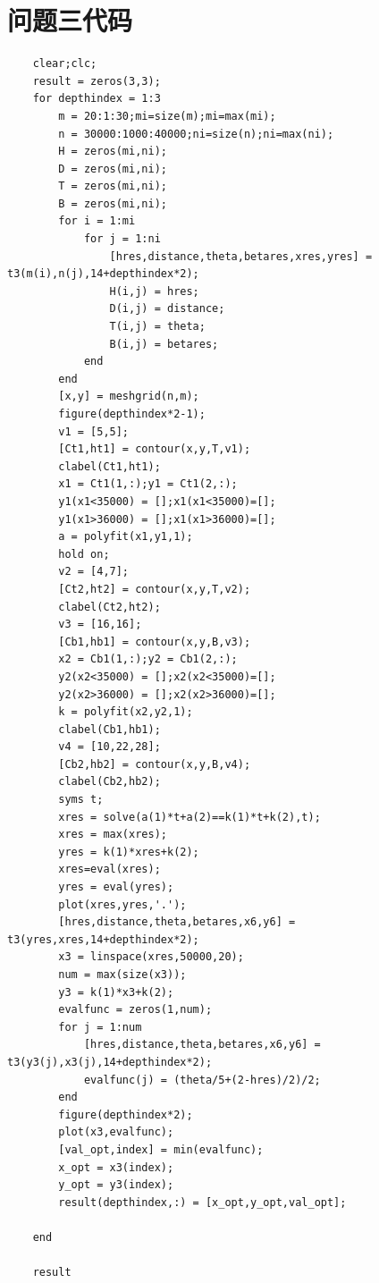 \documentclass{cumcm}
\begin{document}
\section{问题三代码}
\begin{lstlisting}
	clear;clc;
	result = zeros(3,3);
	for depthindex = 1:3
	    m = 20:1:30;mi=size(m);mi=max(mi);
	    n = 30000:1000:40000;ni=size(n);ni=max(ni);
	    H = zeros(mi,ni);
	    D = zeros(mi,ni);
	    T = zeros(mi,ni);
	    B = zeros(mi,ni);
	    for i = 1:mi
	        for j = 1:ni
	            [hres,distance,theta,betares,xres,yres] = t3(m(i),n(j),14+depthindex*2);
	            H(i,j) = hres;
	            D(i,j) = distance;
	            T(i,j) = theta;
	            B(i,j) = betares;
	        end
	    end
	    [x,y] = meshgrid(n,m);
	    figure(depthindex*2-1);
	    v1 = [5,5];
	    [Ct1,ht1] = contour(x,y,T,v1);
	    clabel(Ct1,ht1);
	    x1 = Ct1(1,:);y1 = Ct1(2,:);
	    y1(x1<35000) = [];x1(x1<35000)=[];
	    y1(x1>36000) = [];x1(x1>36000)=[];
	    a = polyfit(x1,y1,1);
	    hold on;
	    v2 = [4,7];
	    [Ct2,ht2] = contour(x,y,T,v2);
	    clabel(Ct2,ht2);
	    v3 = [16,16];
	    [Cb1,hb1] = contour(x,y,B,v3);
	    x2 = Cb1(1,:);y2 = Cb1(2,:);
	    y2(x2<35000) = [];x2(x2<35000)=[];
	    y2(x2>36000) = [];x2(x2>36000)=[];
	    k = polyfit(x2,y2,1);
	    clabel(Cb1,hb1);
	    v4 = [10,22,28];
	    [Cb2,hb2] = contour(x,y,B,v4);
	    clabel(Cb2,hb2);
	    syms t;
	    xres = solve(a(1)*t+a(2)==k(1)*t+k(2),t);
	    xres = max(xres);
	    yres = k(1)*xres+k(2);
	    xres=eval(xres);
	    yres = eval(yres);
	    plot(xres,yres,'.');
	    [hres,distance,theta,betares,x6,y6] = t3(yres,xres,14+depthindex*2);
	    x3 = linspace(xres,50000,20);
	    num = max(size(x3));
	    y3 = k(1)*x3+k(2);
	    evalfunc = zeros(1,num);
	    for j = 1:num
	        [hres,distance,theta,betares,x6,y6] = t3(y3(j),x3(j),14+depthindex*2);
	        evalfunc(j) = (theta/5+(2-hres)/2)/2;
	    end
	    figure(depthindex*2);
	    plot(x3,evalfunc);
	    [val_opt,index] = min(evalfunc);
	    x_opt = x3(index);
	    y_opt = y3(index);
	    result(depthindex,:) = [x_opt,y_opt,val_opt];

	end

	result
\end{lstlisting}
\end{document}
